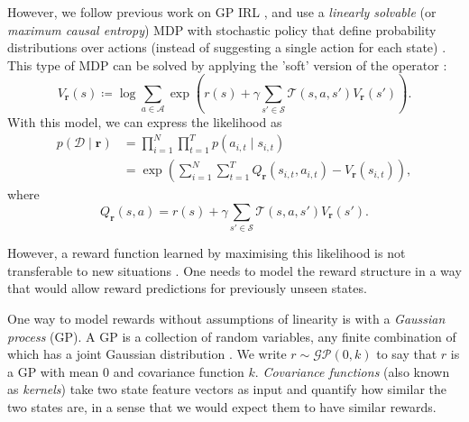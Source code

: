 \documentclass{mpaper}
\newcommand{\V}{V_{\mathbf{r}}}
\begin{document}
However, we follow previous work on GP IRL
\cite{DBLP:conf/nips/LevinePK11,DBLP:conf/uai/JinDAS17}, and use a
\emph{linearly solvable} (or \emph{maximum causal entropy}) MDP with stochastic
policy that define probability distributions over actions (instead of
suggesting a single action for each state) \cite{ziebart2008maximum}. This type
of MDP can be solved by applying the 'soft' version of the operator
\cite{DBLP:conf/nips/LevinePK11,supplementary_material}:
\begin{equation} \label{eq:update_rule}
  \V(s) \coloneqq \log \sum_{a \in \mathcal{A}} \exp\left( r(s) + \gamma\sum_{s'
      \in \mathcal{S}} \mathcal{T}(s, a, s')\V(s') \right).
\end{equation}
With this model, we can express the likelihood as
\cite{DBLP:conf/uai/JinDAS17,DBLP:conf/nips/LevinePK11}
\begin{equation} \label{pDr}
  \begin{split}
    p(\mathcal{D} \mid \mathbf{r}) &= \prod_{i=1}^N \prod_{t=1}^T p(a_{i,t} \mid s_{i,t}) \\
    &= \exp\left( \sum_{i=1}^N \sum_{t=1}^T Q_{\mathbf{r}}(s_{i,t}, a_{i,t}) - \V(s_{i,t}) \right),
  \end{split}
\end{equation}
where
\[
  Q_{\mathbf{r}}(s, a) = r(s) + \gamma\sum_{s' \in \mathcal{S}}
  \mathcal{T}(s, a, s')\V(s').
\]

However, a reward function learned by maximising this likelihood is not
transferable to new situations
\cite{DBLP:conf/uai/JinDAS17,DBLP:conf/nips/LevinePK11}. One needs to model the
reward structure in a way that would allow reward predictions for previously
unseen states.

One way to model rewards without assumptions of linearity is with a
\emph{Gaussian process} (GP). A GP is a collection of random variables, any
finite combination of which has a joint Gaussian distribution
\cite{DBLP:books/lib/RasmussenW06}. We write $r \sim \mathcal{GP}(0,
k)$ to say that $r$ is a GP with mean $0$ and covariance function
$k$. \emph{Covariance functions} (also known as \emph{kernels}) take two state
feature vectors as input and quantify how similar the two states are, in a sense
that we would expect them to have similar rewards.
\end{document}
